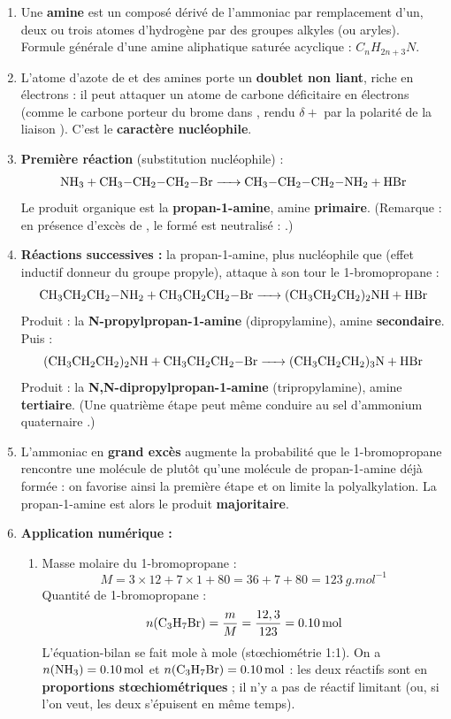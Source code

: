 \documentclass[11pt]{article}
\begin{document}
\begin{corrige}
\begin{enumerate}
\item Une \textbf{amine} est un composé dérivé de l'ammoniac  par remplacement d'un, deux ou trois atomes d'hydrogène par des groupes alkyles (ou aryles). Formule générale d'une amine aliphatique saturée acyclique : $C_nH_{2n+3}N$.
\item L'atome d'azote de  et des amines porte un \textbf{doublet non liant}, riche en électrons : il peut attaquer un atome de carbone déficitaire en électrons (comme le carbone porteur du brome dans , rendu $\delta+$ par la polarité de la liaison ). C'est le \textbf{caractère nucléophile}.
\item \textbf{Première réaction} (substitution nucléophile) : \[ \ce{NH3 + CH3-CH2-CH2-Br -> CH3-CH2-CH2-NH2 + HBr} \] Le produit organique est la \textbf{propan-1-amine}, amine \textbf{primaire}. (Remarque : en présence d'excès de , le  formé est neutralisé : .)
\item \textbf{Réactions successives :} la propan-1-amine, plus nucléophile que  (effet inductif donneur du groupe propyle), attaque à son tour le 1-bromopropane :
\[ \ce{CH3CH2CH2-NH2 + CH3CH2CH2-Br -> (CH3CH2CH2)2NH + HBr} \]
Produit : la \textbf{N-propylpropan-1-amine} (dipropylamine), amine \textbf{secondaire}. Puis :
\[ \ce{(CH3CH2CH2)2NH + CH3CH2CH2-Br -> (CH3CH2CH2)3N + HBr} \]
Produit : la \textbf{N,N-dipropylpropan-1-amine} (tripropylamine), amine \textbf{tertiaire}. (Une quatrième étape peut même conduire au sel d'ammonium quaternaire .)
\item L'ammoniac en \textbf{grand excès} augmente la probabilité que le 1-bromopropane rencontre une molécule de  plutôt qu'une molécule de propan-1-amine déjà formée : on favorise ainsi la première étape et on limite la polyalkylation. La propan-1-amine est alors le produit \textbf{majoritaire}.
\item \textbf{Application numérique :}
\begin{enumerate}
\item Masse molaire du 1-bromopropane  :
\[ M = 3\times 12 + 7\times 1 + 80 = 36 + 7 + 80 = \SI{123}{g.mol^{-1}} \]
Quantité de 1-bromopropane :
\[ n(\ce{C3H7Br}) = \frac{m}{M} = \frac{12,3}{123} = \SI{0,10}{mol} \]
L'équation-bilan se fait mole à mole (stœchiométrie 1:1). On a $n(\ce{NH3}) = \SI{0,10}{mol}$ et $n(\ce{C3H7Br}) = \SI{0,10}{mol}$ : les deux réactifs sont en \textbf{proportions stœchiométriques} ; il n'y a pas de réactif limitant (ou, si l'on veut, les deux s'épuisent en même temps).
\medskip


\end{enumerate}
\end{enumerate}
\end{corrige}
\end{document}
